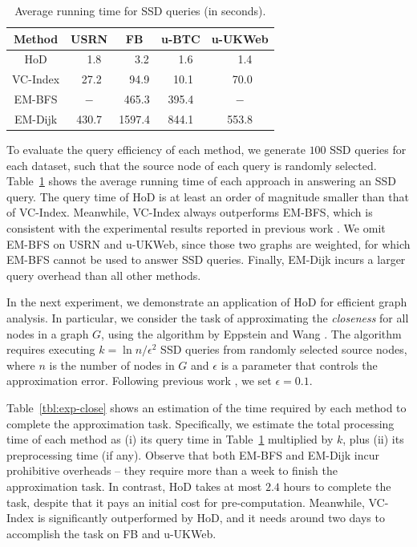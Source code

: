 \documentclass{sig-alternate}
\def\tblcapup{\vspace{-0mm}}
\def\tblcapdown{\vspace{-3mm}}
\def\tblup{\vspace{2mm}}
\begin{document}
\begin{sloppy}
\begin{table}[!t]
\centering
\begin{small}
\caption{Average running time for SSD queries (in seconds).}
\label{tbl:exp-ssd}
\tblup
\begin{tabular}{|c|c|c|c|c|}
\hline
{\bf Method} &   {\bf USRN} & {\bf FB} &  {\bf u-BTC} & {\bf u-UKWeb} \\  \hline
HoD & $\;\,\;\,$1.8 & $\;\,\;\,\;\,$3.2 & $\;\,\;\,$1.6 & $\;\,\;\,$1.4 \\ \hline
VC-Index & $\;\,$27.2 & $\;\,\;\,$94.9 & $\;\,$10.1 & $\;\,$70.0 \\ \hline
EM-BFS & $-$ & $\;\,$465.3 & 395.4 & $-$ \\ \hline
EM-Dijk & 430.7 & 1597.4 & 844.1 & 553.8 \\ \hline
\end{tabular}
\tblcapdown
\end{small}
\end{table}

To evaluate the query efficiency of each method, we generate $100$ SSD queries for each dataset, such that the source node of each query is randomly selected. Table~\ref{tbl:exp-ssd} shows the average running time of each approach in answering an SSD query. The query time of HoD is at least an order of magnitude smaller than that of VC-Index. Meanwhile, VC-Index always outperforms EM-BFS, which is consistent with the experimental results reported in previous work \cite{ckcc12}. We omit EM-BFS on USRN and u-UKWeb, since those two graphs are weighted, for which EM-BFS cannot be used to answer SSD queries. Finally, EM-Dijk incurs a larger query overhead than all other methods.

In the next experiment, we demonstrate an application of HoD for efficient graph analysis. In particular, we consider the task of approximating the {\em closeness} for all nodes in a graph $G$, using the algorithm by Eppstein and Wang \cite{ew04}. The algorithm requires executing $k = \ln n/\epsilon^2$ SSD queries from randomly selected source nodes, where $n$ is the number of nodes in $G$ and $\epsilon$ is a parameter that controls the approximation error. Following previous work \cite{ckcc12}, we set $\epsilon = 0.1$.

Table~\ref{tbl:exp-close} shows an estimation of the time required by each method to complete the approximation task. Specifically, we estimate the total processing time of each method as (i) its query time in Table~\ref{tbl:exp-ssd} multiplied by $k$, plus (ii) its preprocessing time (if any). Observe that both EM-BFS and EM-Dijk incur prohibitive overheads -- they require more than a week to finish the approximation task. In contrast, HoD takes at most $2.4$ hours to complete the task, despite that it pays an initial cost for pre-computation. Meanwhile, VC-Index is significantly outperformed by HoD, and it needs around two days to accomplish the task on FB and u-UKWeb.



\end{sloppy}
\end{document}
